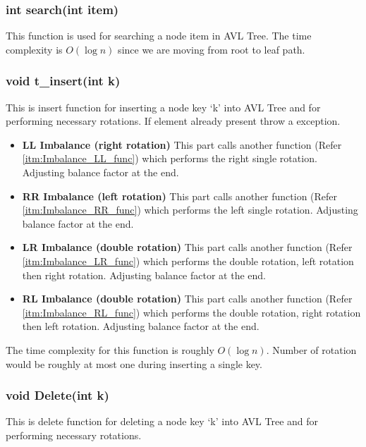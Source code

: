\documentclass{article}
\begin{document}
\subsubsection{int search(int item)}
This function is used for searching a node item in AVL Tree.
The time complexity is $O(\log n)$ since we are moving from root to leaf path.

\subsubsection{void t\_insert(int k)}
\label{insert_function} 
This is insert function for inserting a node key `k' into AVL Tree and for performing necessary rotations. If element already present throw a exception.

\begin{itemize}
	\item \textbf{LL Imbalance (right rotation)}\newline
	This part calls another function (Refer \ref{itm:Imbalance_LL_func}) which performs the right single rotation. Adjusting balance factor at the end.
	\item \textbf{RR Imbalance (left rotation)}\newline
	This part calls another function (Refer \ref{itm:Imbalance_RR_func}) which performs the left single rotation. Adjusting balance factor at the end.
	\item \textbf{LR Imbalance (double rotation)}\newline
	This part calls another function (Refer \ref{itm:Imbalance_LR_func}) which performs the double rotation, left rotation then right rotation. Adjusting balance factor at the end.
	\item \textbf{RL Imbalance (double rotation)}\newline
	This part calls another function (Refer \ref{itm:Imbalance_RL_func}) which performs the double rotation, right rotation then left rotation. Adjusting balance factor at the end.
\end{itemize}
The time complexity for this function is roughly $O(\log n)$. Number of rotation would be roughly at most one during inserting a single key.

\subsubsection{void Delete(int k)}
\label{delete_function}
This is delete function for deleting a node key `k' into AVL Tree and for performing necessary rotations.
\end{document}
